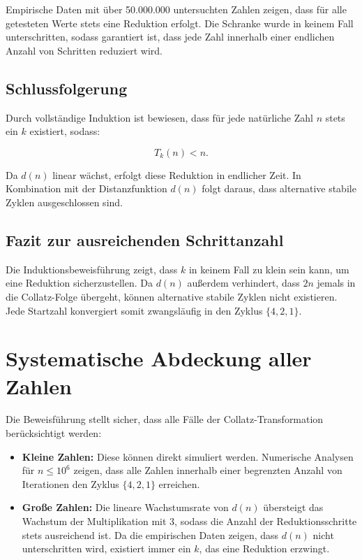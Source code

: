 \documentclass[a4paper,12pt]{article}
\begin{document}
Empirische Daten mit über 50.000.000 untersuchten Zahlen zeigen, dass für alle getesteten Werte stets eine Reduktion erfolgt. Die Schranke wurde in keinem Fall unterschritten, sodass garantiert ist, dass jede Zahl innerhalb einer endlichen Anzahl von Schritten reduziert wird.

\subsection{Schlussfolgerung}

Durch vollständige Induktion ist bewiesen, dass für jede natürliche Zahl \( n \) stets ein \( k \) existiert, sodass:

\[
T_k(n) < n.
\]

Da \( d(n) \) linear wächst, erfolgt diese Reduktion in endlicher Zeit. In Kombination mit der Distanzfunktion \( d(n) \) folgt daraus, dass alternative stabile Zyklen ausgeschlossen sind.

\subsection{Fazit zur ausreichenden Schrittanzahl}

Die Induktionsbeweisführung zeigt, dass \( k \) in keinem Fall zu klein sein kann, um eine Reduktion sicherzustellen. Da \( d(n) \) außerdem verhindert, dass \( 2n \) jemals in die Collatz-Folge übergeht, können alternative stabile Zyklen nicht existieren. Jede Startzahl konvergiert somit zwangsläufig in den Zyklus \( \{4,2,1\} \).



\section{Systematische Abdeckung aller Zahlen}

Die Beweisführung stellt sicher, dass alle Fälle der Collatz-Transformation berücksichtigt werden:

\begin{itemize}
    \item \textbf{Kleine Zahlen:} Diese können direkt simuliert werden. Numerische Analysen für \( n \leq 10^6 \) zeigen, dass alle Zahlen innerhalb einer begrenzten Anzahl von Iterationen den Zyklus \( \{4, 2, 1\} \) erreichen.
    \item \textbf{Große Zahlen:} Die lineare Wachstumsrate von \( d(n) \) übersteigt das Wachstum der Multiplikation mit 3, sodass die Anzahl der Reduktionsschritte stets ausreichend ist. Da die empirischen Daten zeigen, dass \( d(n) \) nicht unterschritten wird, existiert immer ein \( k \), das eine Reduktion erzwingt.
\end{itemize}
\end{document}
